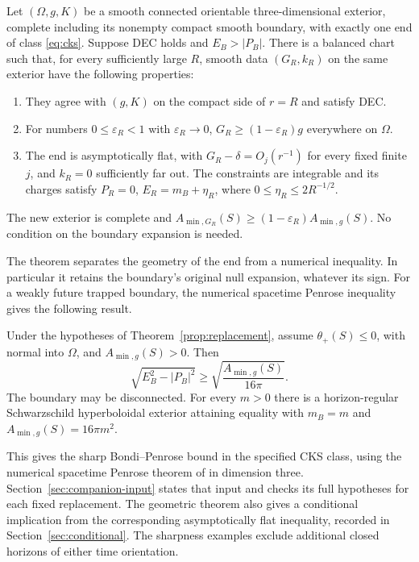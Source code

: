 \begin{theorem}\label{prop:replacement}
Let $(\Omega,g,K)$ be a smooth connected orientable three-dimensional
exterior, complete including its nonempty compact smooth boundary,
with exactly one end of class \eqref{eq:cks}. Suppose DEC holds and
$E_B>|P_B|$. There is a balanced chart such that, for every sufficiently
large $R$, smooth data $(G_R,k_R)$ on the same exterior have the following
properties:
\begin{enumerate}
\item They agree with $(g,K)$ on the compact side of $r=R$ and satisfy DEC.
\item For numbers $0\leq\varepsilon_R<1$ with $\varepsilon_R\to0$,
      $G_R\geq(1-\varepsilon_R)g$ everywhere on $\Omega$.
\item The end is asymptotically flat, with $G_R-\delta=O_j(r^{-1})$
      for every fixed finite $j$, and $k_R=0$ sufficiently far out.
      The constraints are integrable and its charges satisfy
      $P_R=0$, $E_R=m_B+\eta_R$, where $0\leq\eta_R\leq2R^{-1/2}$.
\end{enumerate}
The new exterior is complete and
$A_{\min,G_R}(S)\geq(1-\varepsilon_R)A_{\min,g}(S)$.
No condition on the boundary expansion is needed.
\end{theorem}

The theorem separates the geometry of the end from a numerical
inequality. In particular it retains the boundary's original null
expansion, whatever its sign. For a weakly future trapped boundary,
the numerical spacetime Penrose inequality gives the following result.

\begin{corollary}
\label{cor:cks-inequality}
Under the hypotheses of Theorem~\ref{prop:replacement}, assume
$\theta_+(S)\leq0$, with normal into $\Omega$, and
$A_{\min,g}(S)>0$. Then
\begin{equation}\label{eq:main}
 \sqrt{E_B^2-|P_B|^2}\geq
 \sqrt{\frac{A_{\min,g}(S)}{16\pi}}.
\end{equation}
The boundary may be disconnected. For every $m>0$ there is a
horizon-regular Schwarzschild hyperboloidal exterior attaining equality
with $m_B=m$ and $A_{\min,g}(S)=16\pi m^2$.
\end{corollary}

This gives the sharp Bondi--Penrose bound in the specified CKS class,
using the numerical spacetime Penrose theorem of
\cite[Definitions~1.1--1.2 and Theorem~1.3]{NumericalPenrose} in
dimension three. Section~\ref{sec:companion-input} states that input
and checks its full hypotheses for each fixed replacement. The
geometric theorem also gives a conditional implication from the
corresponding asymptotically flat inequality, recorded in
Section~\ref{sec:conditional}. The sharpness examples exclude additional
closed horizons of either time orientation.

